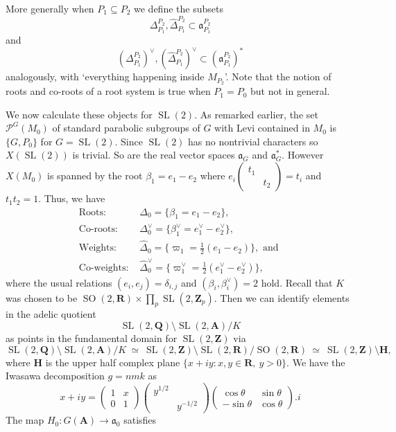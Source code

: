 \documentclass[11pt]{amsart}
\def\A{\mathbf A}
\def\Q{\mathbf Q}
\def\R{\mathbf R}
\def\Z{\mathbf Z}
\def\PPP{\mathcal P}
\def\aaa{\mathfrak a}
\def\cb#1{{\color{blue}#1}}
\def\bs{\setminus} 			%
\def\se{\subseteq}
\def\sl{\operatorname{SL}}
\def\so{\operatorname{SO}}
\theoremstyle{remark}
\begin{document}
More generally when $P_1 \se P_2$ we define the subsets
\[ \Delta_{P_1}^{P_2}, \hat\Delta_{P_1}^{P_2} \subset \aaa_{P_1}^{P_2} \]
and
\[ (\Delta_{P_1}^{P_2})^\vee, (\hat\Delta_{P_1}^{P_2})^\vee \subset (\aaa_{P_1}^{P_2})^* \]
analogously, with `everything happening inside $M_{P_2}$'. Note that the notion of roots and co-roots of a root system is true when $P_1 = P_0$ but not in general. 

\cb{
We now calculate these objects for $\sl (2)$. As remarked earlier, the set $\PPP^G(M_0)$ of standard parabolic subgroups of $G$ with Levi contained in $M_0$ is $\{G, P_0\}$ for $G = \sl(2)$. Since $\sl(2)$ has no nontrivial characters so $X(\sl(2))$ is trivial. So are the real vector spaces $\aaa_G$ and $\aaa_G^*$. However $X(M_0)$ is spanned by the root $\beta_1 = e_1 - e_2$ where $e_i\begin{pmatrix} t_1 & \\ & t_2 \end{pmatrix} = t_i$ and $t_1 t_2 = 1$. 
Thus, we have}
\cb{\begin{align*}
	 \text{Roots: } & \Delta_0 = \{\beta_1 = e_1 - e_2 \}, \\
	 \text{Co-roots: } & \Delta_0^\vee = \{ \beta_1^\vee = e_1^\vee - e_2^\vee \}, \\
	 \text{Weights: } & \hat\Delta_0 = \{ \varpi_1 = \frac{1}{2}(e_1 - e_2) \}, \text{ and } \\
	 \text{Co-weights: } & \hat\Delta_0^\vee = \{ \varpi_1^\vee = \frac{1}{2}(e_1^\vee - e_2^\vee) \},
\end{align*}
where the usual relations $(e_i, e_j) = \delta_{i, j}$ and $(\beta_i, \beta_i^\vee) = 2$ hold. 
}
\cb{
Recall that $K$ was chosen to be $\so(2, \R) \times \displaystyle\prod_p \sl(2, \Z_p)$. Then we can identify elements in the adelic quotient 
\[ \sl(2, \Q) \bs \sl(2, \A) / K \]
as points in the fundamental domain for $\sl(2, \Z)$ via
\begin{equation} \label{fund_dom} 
\sl(2, \Q) \bs \sl(2, \A) / K \ \simeq \ \sl(2, \Z) \bs \sl(2, \R) / \so(2, \R) \ 
		\simeq \ \sl(2, \Z) \bs \mathbf H,
\end{equation}
where $\mathbf H$ is the upper half complex plane $\{ x + i y : x, y \in \R, \ y > 0\}$. We have the Iwasawa decomposition $g = nmk$ as 
\[ x + i y = \begin{pmatrix} 1 & x \\ 0 & 1 \end{pmatrix} \begin{pmatrix} y^{1/2} & \\ & y^{-1/2} \end{pmatrix}
		\begin{pmatrix} \cos \theta & \sin \theta \\ -\sin \theta & \cos \theta \end{pmatrix} . i \]
The map $H_0 : G(\A) \to \aaa_0$ satisfies}
\end{document}
